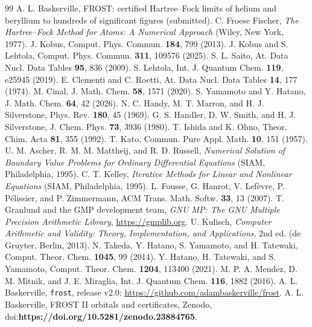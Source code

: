 \documentclass[aps,pra,reprint,superscriptaddress,amsmath,amssymb,longbibliography]{revtex4-2}
\begin{document}
\begin{thebibliography}{99}
 A. L. Baskerville, FROST: certified Hartree--Fock limits of helium and beryllium to hundreds of significant figures (submitted).
 C. Froese Fischer, \textit{The Hartree--Fock Method for Atoms: A Numerical Approach} (Wiley, New York, 1977).
 J. Kobus, Comput. Phys. Commun. \textbf{184}, 799 (2013).
 J. Kobus and S. Lehtola, Comput. Phys. Commun. \textbf{311}, 109576 (2025).
 S. L. Saito, At. Data Nucl. Data Tables \textbf{95}, 836 (2009).
 S. Lehtola, Int. J. Quantum Chem. \textbf{119}, e25945 (2019).
 E. Clementi and C. Roetti, At. Data Nucl. Data Tables \textbf{14}, 177 (1974).
 M. Cinal, J. Math. Chem. \textbf{58}, 1571 (2020).
 S. Yamamoto and Y. Hatano, J. Math. Chem. \textbf{64}, 42 (2026).
 N. C. Handy, M. T. Marron, and H. J. Silverstone, Phys. Rev. \textbf{180}, 45 (1969).
 G. S. Handler, D. W. Smith, and H. J. Silverstone, J. Chem. Phys. \textbf{73}, 3936 (1980).
 T. Ishida and K. Ohno, Theor. Chim. Acta \textbf{81}, 355 (1992).
 T. Kato, Commun. Pure Appl. Math. \textbf{10}, 151 (1957).
 U. M. Ascher, R. M. M. Mattheij, and R. D. Russell, \textit{Numerical Solution of Boundary Value Problems for Ordinary Differential Equations} (SIAM, Philadelphia, 1995).
 C. T. Kelley, \textit{Iterative Methods for Linear and Nonlinear Equations} (SIAM, Philadelphia, 1995).
 L. Fousse, G. Hanrot, V. Lef\`evre, P. P\'elissier, and P. Zimmermann, ACM Trans. Math. Softw. \textbf{33}, 13 (2007).
 T. Granlund and the GMP development team, \textit{GNU MP: The GNU Multiple Precision Arithmetic Library}, \url{https://gmplib.org}.
 U. Kulisch, \textit{Computer Arithmetic and Validity: Theory, Implementation, and Applications}, 2nd ed. (de Gruyter, Berlin, 2013).
 N. Takeda, Y. Hatano, S. Yamamoto, and H. Tatewaki, Comput. Theor. Chem. \textbf{1045}, 99 (2014).
 Y. Hatano, H. Tatewaki, and S. Yamamoto, Comput. Theor. Chem. \textbf{1204}, 113400 (2021).
 M. P. A. Mendez, D. M. Mitnik, and J. E. Miraglia, Int. J. Quantum Chem. \textbf{116}, 1882 (2016).
 A. L. Baskerville, \texttt{frost}, release v2.0: \url{https://github.com/adambaskerville/frost}.
 A. L. Baskerville, FROST II orbitals and certificates, Zenodo, doi:\textbf{https://doi.org/10.5281/zenodo.23884765}.
\end{thebibliography}
\end{document}
